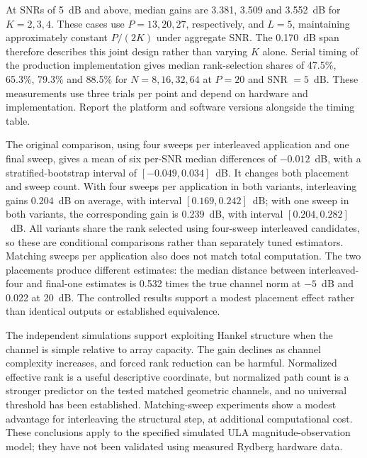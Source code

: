 At SNRs of 5~dB and above, median gains are 3.381, 3.509 and 3.552~dB for
$K=2,3,4$. These cases use $P=13,20,27$, respectively, and $L=5$,
maintaining approximately constant $P/(2K)$ under aggregate SNR. The
0.170~dB span therefore describes this joint design rather than varying
$K$ alone. Serial timing of the production implementation gives median
rank-selection shares of 47.5\%, 65.3\%, 79.3\% and 88.5\% for
$N=8,16,32,64$ at $P=20$ and SNR $=5$~dB. These measurements use three
trials per point and depend on hardware and implementation. Report the
platform and software versions alongside the timing table.

The original comparison, using four sweeps per interleaved application
and one final sweep, gives a mean of six per-SNR median differences of
$-0.012$~dB, with a stratified-bootstrap interval of $[-0.049,0.034]$~dB.
It changes both placement and sweep count. With four sweeps per application
in both variants, interleaving gains 0.204~dB on average, with interval
$[0.169,0.242]$~dB; with one sweep in both variants, the corresponding
gain is 0.239~dB, with interval $[0.204,0.282]$~dB. All variants share
the rank selected using four-sweep interleaved candidates, so these are
conditional comparisons rather than separately tuned estimators.
Matching sweeps per application also does not match total computation.
The two placements produce different estimates: the median distance
between interleaved-four and final-one estimates is 0.532 times the true
channel norm at $-5$~dB and 0.022 at 20~dB. The controlled results support
a modest placement effect rather than identical outputs or established
equivalence.


The independent simulations support exploiting Hankel structure when the
channel is simple relative to array capacity. The gain declines as channel
complexity increases, and forced rank reduction can be harmful. Normalized
effective rank is a useful descriptive coordinate, but normalized path
count is a stronger predictor on the tested matched geometric channels,
and no universal threshold has been established. Matching-sweep experiments
show a modest advantage for interleaving the structural step, at additional
computational cost. These conclusions apply to the specified simulated
ULA magnitude-observation model; they have not been validated using
measured Rydberg hardware data.
